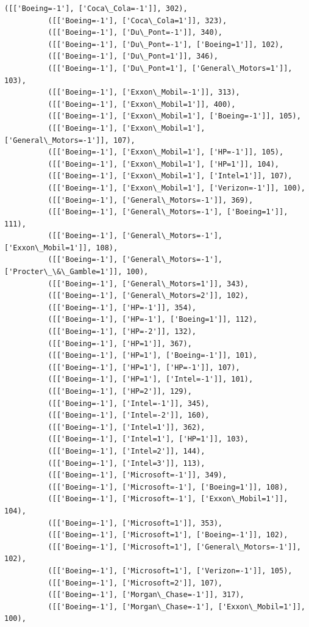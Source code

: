 \documentclass[11pt]{article}
\begin{document}
\begin{Verbatim}[commandchars=\\\{\}]
          ([['Boeing=-1'], ['Coca\_Cola=-1']], 302),
          ([['Boeing=-1'], ['Coca\_Cola=1']], 323),
          ([['Boeing=-1'], ['Du\_Pont=-1']], 340),
          ([['Boeing=-1'], ['Du\_Pont=-1'], ['Boeing=1']], 102),
          ([['Boeing=-1'], ['Du\_Pont=1']], 346),
          ([['Boeing=-1'], ['Du\_Pont=1'], ['General\_Motors=1']], 103),
          ([['Boeing=-1'], ['Exxon\_Mobil=-1']], 313),
          ([['Boeing=-1'], ['Exxon\_Mobil=1']], 400),
          ([['Boeing=-1'], ['Exxon\_Mobil=1'], ['Boeing=-1']], 105),
          ([['Boeing=-1'], ['Exxon\_Mobil=1'], ['General\_Motors=-1']], 107),
          ([['Boeing=-1'], ['Exxon\_Mobil=1'], ['HP=-1']], 105),
          ([['Boeing=-1'], ['Exxon\_Mobil=1'], ['HP=1']], 104),
          ([['Boeing=-1'], ['Exxon\_Mobil=1'], ['Intel=1']], 107),
          ([['Boeing=-1'], ['Exxon\_Mobil=1'], ['Verizon=-1']], 100),
          ([['Boeing=-1'], ['General\_Motors=-1']], 369),
          ([['Boeing=-1'], ['General\_Motors=-1'], ['Boeing=1']], 111),
          ([['Boeing=-1'], ['General\_Motors=-1'], ['Exxon\_Mobil=1']], 108),
          ([['Boeing=-1'], ['General\_Motors=-1'], ['Procter\_\&\_Gamble=1']], 100),
          ([['Boeing=-1'], ['General\_Motors=1']], 343),
          ([['Boeing=-1'], ['General\_Motors=2']], 102),
          ([['Boeing=-1'], ['HP=-1']], 354),
          ([['Boeing=-1'], ['HP=-1'], ['Boeing=1']], 112),
          ([['Boeing=-1'], ['HP=-2']], 132),
          ([['Boeing=-1'], ['HP=1']], 367),
          ([['Boeing=-1'], ['HP=1'], ['Boeing=-1']], 101),
          ([['Boeing=-1'], ['HP=1'], ['HP=-1']], 107),
          ([['Boeing=-1'], ['HP=1'], ['Intel=-1']], 101),
          ([['Boeing=-1'], ['HP=2']], 129),
          ([['Boeing=-1'], ['Intel=-1']], 345),
          ([['Boeing=-1'], ['Intel=-2']], 160),
          ([['Boeing=-1'], ['Intel=1']], 362),
          ([['Boeing=-1'], ['Intel=1'], ['HP=1']], 103),
          ([['Boeing=-1'], ['Intel=2']], 144),
          ([['Boeing=-1'], ['Intel=3']], 113),
          ([['Boeing=-1'], ['Microsoft=-1']], 349),
          ([['Boeing=-1'], ['Microsoft=-1'], ['Boeing=1']], 108),
          ([['Boeing=-1'], ['Microsoft=-1'], ['Exxon\_Mobil=1']], 104),
          ([['Boeing=-1'], ['Microsoft=1']], 353),
          ([['Boeing=-1'], ['Microsoft=1'], ['Boeing=-1']], 102),
          ([['Boeing=-1'], ['Microsoft=1'], ['General\_Motors=-1']], 102),
          ([['Boeing=-1'], ['Microsoft=1'], ['Verizon=-1']], 105),
          ([['Boeing=-1'], ['Microsoft=2']], 107),
          ([['Boeing=-1'], ['Morgan\_Chase=-1']], 317),
          ([['Boeing=-1'], ['Morgan\_Chase=-1'], ['Exxon\_Mobil=1']], 100),

\end{Verbatim}
\end{document}
